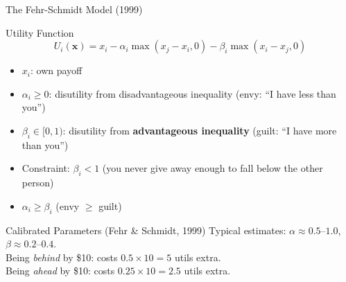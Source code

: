 \documentclass[aspectratio=169]{beamer}
\begin{document}
\begin{frame}{The Fehr-Schmidt Model (1999)}
\begin{block}{Utility Function}
\[
  U_i(\mathbf{x}) = x_i - \alpha_i \max(x_j - x_i, 0) - \beta_i \max(x_i - x_j, 0)
\]
\begin{itemize}
  \item $x_i$: own payoff
  \item $\alpha_i \geq 0$: disutility from \alert{disadvantageous inequality} (envy: ``I have less than you'')
  \item $\beta_i \in [0,1)$: disutility from \textbf{advantageous inequality} (guilt: ``I have more than you'')
  \item Constraint: $\beta_i < 1$ (you never give away enough to fall below the other person)
  \item $\alpha_i \geq \beta_i$ (envy $\geq$ guilt)
\end{itemize}
\end{block}
\begin{block}{Calibrated Parameters (Fehr \& Schmidt, 1999)}
Typical estimates: $\alpha \approx 0.5$--$1.0$, $\beta \approx 0.2$--$0.4$.\\
Being \textit{behind} by \$10: costs $0.5 \times 10 = 5$ utils extra.\\
Being \textit{ahead} by \$10: costs $0.25 \times 10 = 2.5$ utils extra.
\end{block}
\end{frame}
\end{document}
